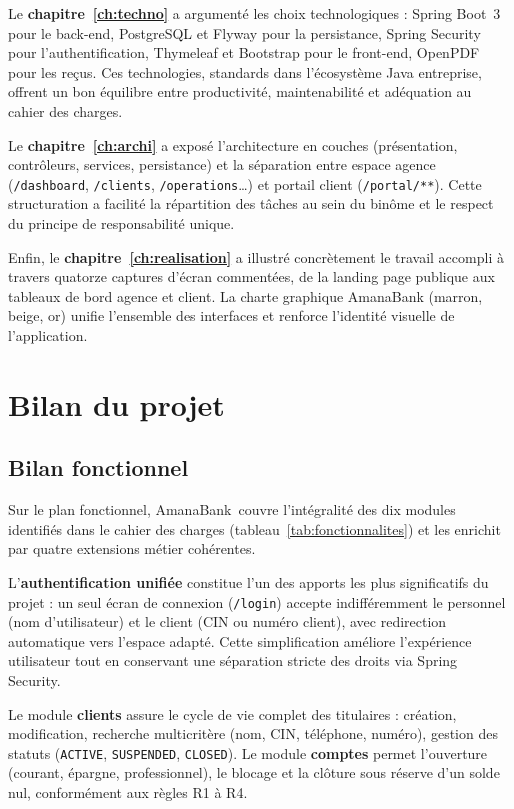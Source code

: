 \documentclass[11pt,a4paper,oneside]{report}
\newcommand{\nomapplication}{AmanaBank}
\begin{document}
Le \textbf{chapitre~\ref{ch:techno}} a argumenté les choix technologiques : Spring Boot~3 pour le back-end, PostgreSQL et Flyway pour la persistance, Spring Security pour l'authentification, Thymeleaf et Bootstrap pour le front-end, OpenPDF pour les reçus. Ces technologies, standards dans l'écosystème Java entreprise, offrent un bon équilibre entre productivité, maintenabilité et adéquation au cahier des charges.

Le \textbf{chapitre~\ref{ch:archi}} a exposé l'architecture en couches (présentation, contrôleurs, services, persistance) et la séparation entre espace agence (\texttt{/dashboard}, \texttt{/clients}, \texttt{/operations}…) et portail client (\texttt{/portal/**}). Cette structuration a facilité la répartition des tâches au sein du binôme et le respect du principe de responsabilité unique.

Enfin, le \textbf{chapitre~\ref{ch:realisation}} a illustré concrètement le travail accompli à travers quatorze captures d'écran commentées, de la landing page publique aux tableaux de bord agence et client. La charte graphique AmanaBank (marron, beige, or) unifie l'ensemble des interfaces et renforce l'identité visuelle de l'application.

\section*{Bilan du projet}

\subsection*{Bilan fonctionnel}

Sur le plan fonctionnel, \nomapplication\ couvre l'intégralité des dix modules identifiés dans le cahier des charges (tableau~\ref{tab:fonctionnalites}) et les enrichit par quatre extensions métier cohérentes.

L'\textbf{authentification unifiée} constitue l'un des apports les plus significatifs du projet : un seul écran de connexion (\texttt{/login}) accepte indifféremment le personnel (nom d'utilisateur) et le client (CIN ou numéro client), avec redirection automatique vers l'espace adapté. Cette simplification améliore l'expérience utilisateur tout en conservant une séparation stricte des droits via Spring Security.

Le module \textbf{clients} assure le cycle de vie complet des titulaires : création, modification, recherche multicritère (nom, CIN, téléphone, numéro), gestion des statuts (\texttt{ACTIVE}, \texttt{SUSPENDED}, \texttt{CLOSED}). Le module \textbf{comptes} permet l'ouverture (courant, épargne, professionnel), le blocage et la clôture sous réserve d'un solde nul, conformément aux règles R1 à R4.
\end{document}
